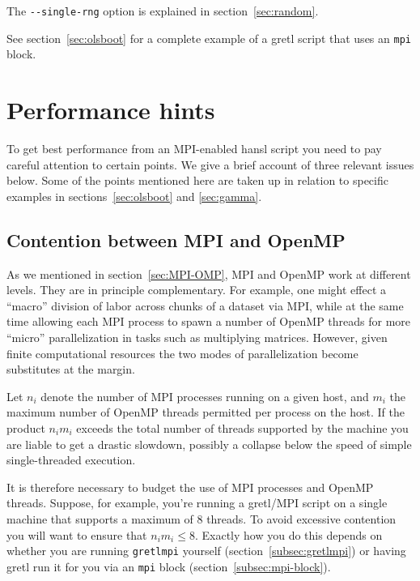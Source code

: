 \documentclass{article}
\begin{document}
The \verb|--single-rng| option is explained in
section~\ref{sec:random}.

\vspace{1ex}

See section~\ref{sec:olsboot} for a complete example of a gretl script
that uses an \texttt{mpi} block.

\section{Performance hints}
\label{sec:performance}

To get best performance from an MPI-enabled hansl script you need to
pay careful attention to certain points. We give a brief account of
three relevant issues below. Some of the points mentioned here are
taken up in relation to specific examples in
sections~\ref{sec:olsboot} and \ref{sec:gamma}.

\subsection{Contention between MPI and OpenMP}
\label{sec:contention}

As we mentioned in section~\ref{sec:MPI-OMP}, MPI and \textsf{OpenMP}
work at different levels. They are in principle complementary. For
example, one might effect a ``macro'' division of labor across chunks
of a dataset via MPI, while at the same time allowing each MPI process
to spawn a number of \textsf{OpenMP} threads for more ``micro''
parallelization in tasks such as multiplying matrices.
However, given finite computational resources the two modes of
parallelization become substitutes at the margin. 

Let $n_i$ denote the number of MPI processes running on a given host,
and $m_i$ the maximum number of \textsf{OpenMP} threads permitted per
process on the host. If the product $n_im_i$ exceeds the total number
of threads supported by the machine you are liable to get a drastic
slowdown, possibly a collapse below the speed of simple
single-threaded execution.

It is therefore necessary to budget the use of MPI processes and
\textsf{OpenMP} threads. Suppose, for example, you're running a
gretl/MPI script on a single machine that supports a maximum of 8
threads. To avoid excessive contention you will want to ensure that
$n_im_i \leq 8$. Exactly how you do this depends on whether you are
running \texttt{gretlmpi} yourself
(section~\ref{subsec:gretlmpi}) or having gretl run it for you via
an \texttt{mpi} block (section~\ref{subsec:mpi-block}).
\end{document}
